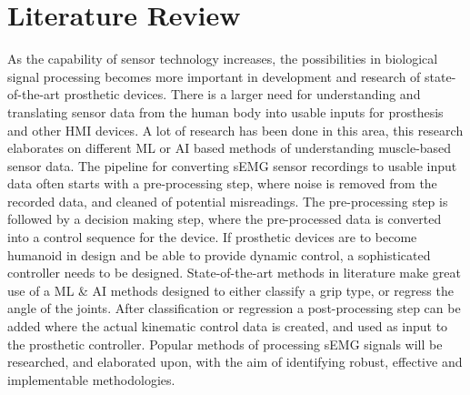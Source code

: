 \documentclass[../main.tex]{subfiles}
\begin{document}
\section{Literature Review}
\label{sec:literature}

As the capability of sensor technology increases, the possibilities in biological signal processing becomes more important in development and research of state-of-the-art prosthetic devices.
There is a larger need for understanding and translating sensor data from the human body into usable inputs for prosthesis and other \gls{HMI} devices.
A lot of research has been done in this area, this research elaborates on different \gls{ML} or \gls{AI} based methods of understanding muscle-based sensor data.
The pipeline for converting \gls{sEMG} sensor recordings to usable input data often starts with a pre-processing step, where noise is removed from the recorded data, and cleaned of potential misreadings.
The pre-processing step is followed by a decision making step, where the pre-processed data is converted into a control sequence for the device.
If prosthetic devices are to become humanoid in design and be able to provide dynamic control, a sophisticated controller needs to be designed.
State-of-the-art methods in literature make great use of a \gls{ML} \& \gls{AI} methods designed to either classify a grip type, or regress the angle of the joints.
After classification or regression a post-processing step can be added where the actual kinematic control data is created, and used as input to the prosthetic controller. 
Popular methods of processing sEMG signals will be researched, and elaborated upon, with the aim of identifying robust, effective and implementable methodologies.

\end{document}
